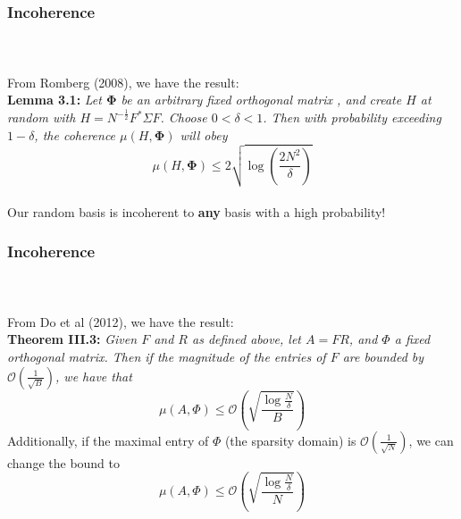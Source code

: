 \begin{frame}[t]
\frametitle{Incoherence}
\framesubtitle{~~}  %

From Romberg (2008), we have the result:\\

\textbf{Lemma 3.1:} \textit{Let $\boldsymbol{\Phi}$ be an arbitrary fixed orthogonal matrix
, and create $H$ at random with $H = N^{-\frac{1}{2}} F^* \Sigma F$. Choose $0<\delta<1$.
Then with probability exceeding $1-\delta$, the coherence $\mu(H,\boldsymbol{\Phi})$ 
will obey} \\
\begin{equation}
	\mu(H,\boldsymbol{\Phi}) \leq 2 \sqrt{\log \left(\frac{2N^2}{\delta} \right)}
	\label{incoherence_bd1}
\end{equation}
\\
Our random basis is incoherent to \textbf{any} basis with a high probability!

\end{frame}



\begin{frame}[t]
\frametitle{Incoherence}
\framesubtitle{~~}  %

From Do et al (2012), we have the result:\\

\textbf{Theorem III.3:} \textit{Given $F$ and $R$ as defined above, let $A=FR$, and $\Phi$ a fixed orthogonal matrix. Then if the magnitude of the entries of $F$ are bounded by $\mathcal{O}(\frac{1}{\sqrt{B}})$, we have that}
\begin{equation}
	\mu(A,\Phi) \leq \mathcal{O}\left(\sqrt{\frac{\log{\frac{N}{\delta}}}{B}}\right)
\end{equation}
Additionally, if the maximal entry of $\Phi$ (the sparsity domain) is $\mathcal{O}\left(\frac{1}{\sqrt{N}}\right)$,
we can change the bound to 
\begin{equation}
	\label{incoherence_bd2}
	\mu(A,\Phi) \leq \mathcal{O} \left( \sqrt{\frac{\log{\frac{N}{\delta}}}{N}}\right)
\end{equation}

\end{frame}
